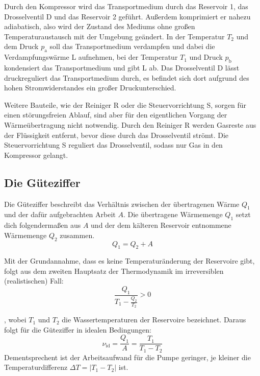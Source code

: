 Durch den Kompressor wird das Transportmedium durch das Reservoir 1, das Drosselventil D und das Reservoir 2 geführt.
Außerdem komprimiert er nahezu adiabatisch, also wird der Zustand des Mediums ohne großen Temperaturaustausch mit der Umgebung geändert.
In der Temperatur $T_2$ und  dem Druck $p_{\text{a}}$ soll das Transportmedium verdampfen und dabei die Verdampfungswärme L aufnehmen, 
bei der Temperatur $T_1$ und Druck $p_{\text{b}}$ kondensiert das Transportmedium und gibt L ab.
Das Drosselventil D lässt druckreguliert das Transportmedium durch, es befindet sich dort aufgrund des hohen Stromwiderstandes ein großer Druckunterschied.

Weitere Bauteile, wie der Reiniger R oder die Steuervorrichtung S, sorgen für einen störungsfreien Ablauf, sind aber für den eigentlichen Vorgang der Wärmeübertragung nicht notwendig.
Durch den Reiniger R werden Gasreste aus der Flüssigkeit entfernt, bevor diese durch das Drosselventil strömt.
Die Steuervorrichtung S reguliert das Drosselventil, sodass nur Gas in den Kompressor gelangt. 

\subsection{Die Güteziffer} \label{subsec:gueteziffer}
Die Güteziffer beschreibt das Verhältnis zwischen der übertragenen Wärme $Q_1$ und der dafür aufgebrachten Arbeit $A$.
Die übertragene Wärmemenge $Q_1$ setzt dich folgendermaßen aus $A$ und der dem kälteren Reservoir entnommene Wärmemenge $Q_2$ zusammen.
\begin{equation}
    Q_1 = Q_2 + A 
\end{equation}

Mit der Grundannahme, dass es keine Temperaturänderung der Reservoire gibt, folgt aus dem zweiten Hauptsatz der Thermodynamik im irreversiblen (realistischen) Fall:
\begin{equation}
    \frac{Q_1}{T_1 - \frac{Q_2}{T_2}} > 0
\end{equation}

, wobei $T_1$ und $T_2$ die Wassertemperaturen der Reservoire bezeichnet.
Daraus folgt für die Güteziffer in idealen Bedingungen:
\begin{equation}\label{eqn:idguete}
    \nu_{\text{id}} = \frac{Q_1}{A} = \frac{T_1}{T_1 - T_2}
\end{equation}
Dementsprechent ist der Arbeitsaufwand für die Pumpe geringer, je kleiner die Temperaturdifferenz $\Delta T = |T_1 - T_2|$ ist.

